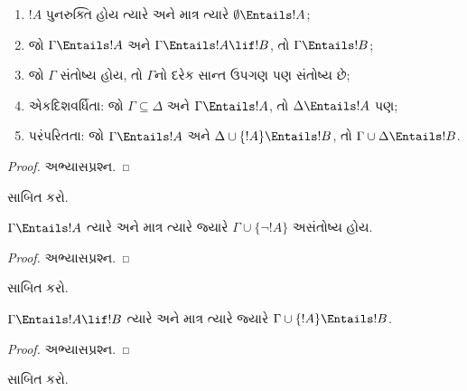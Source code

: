 \documentclass[../../../include/open-logic-section]{subfiles}
\begin{document}
\begin{prop}
\begin{enumerate}
\item $!A$ પુનરુક્તિ હોય ત્યારે અને માત્ર ત્યારે
  $\emptyset \Entails !A$;
\item જો $\Gamma \Entails !A$ અને $\Gamma \Entails !A \lif !B$, તો
  $\Gamma \Entails !B$;
\item જો $\Gamma$ સંતોષ્ય હોય, તો $\Gamma$નો દરેક સાન્ત ઉપગણ પણ
  સંતોષ્ય છે;
\item {} એકદિશવર્ધિતા: જો
  $\Gamma \subseteq \Delta$ અને $\Gamma \Entails !A$, તો
  $\Delta \Entails !A$ પણ;
\item {} પરંપરિતતા: જો $\Gamma \Entails !A$ અને
  $\Delta \cup \{ !A\} \Entails !B$, તો $\Gamma \cup \Delta \Entails
  !B$.
\end{enumerate}
\end{prop}

\begin{proof}
અભ્યાસપ્રશ્ન.
\end{proof}

\begin{prob}
 સાબિત કરો.
\end{prob}

\begin{prop}
  $\Gamma \Entails !A$ ત્યારે અને માત્ર ત્યારે જ્યારે
  $\Gamma \cup \{\lnot !A\}$ અસંતોષ્ય હોય.
\end{prop}

\begin{proof}
અભ્યાસપ્રશ્ન.
\end{proof}

\begin{prob}
 સાબિત કરો.
\end{prob}

\begin{thm}[અર્થાનુસારી નિગમન પ્રમેય]
   $\Gamma \Entails !A \lif !B$ ત્યારે અને માત્ર
  ત્યારે જ્યારે $\Gamma \cup \{!A\} \Entails !B$.
\end{thm}

\begin{proof}
અભ્યાસપ્રશ્ન.
\end{proof}

\begin{prob}
 સાબિત કરો.
\end{prob}
\end{document}
